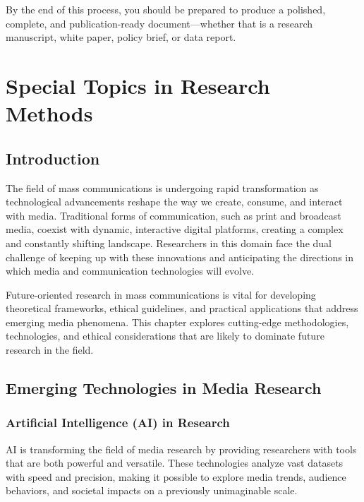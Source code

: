 \documentclass[
]{book}
\begin{document}
By the end of this process, you should be prepared to produce a polished, complete, and publication-ready document---whether that is a research manuscript, white paper, policy brief, or data report.

\chapter{Special Topics in Research Methods}\label{special-topics-in-research-methods}

\section{Introduction}\label{introduction-1}

The field of mass communications is undergoing rapid transformation as technological advancements reshape the way we create, consume, and interact with media. Traditional forms of communication, such as print and broadcast media, coexist with dynamic, interactive digital platforms, creating a complex and constantly shifting landscape. Researchers in this domain face the dual challenge of keeping up with these innovations and anticipating the directions in which media and communication technologies will evolve.

Future-oriented research in mass communications is vital for developing theoretical frameworks, ethical guidelines, and practical applications that address emerging media phenomena. This chapter explores cutting-edge methodologies, technologies, and ethical considerations that are likely to dominate future research in the field.

\section{Emerging Technologies in Media Research}\label{emerging-technologies-in-media-research}

\subsection*{Artificial Intelligence (AI) in Research}\label{artificial-intelligence-ai-in-research}

AI is transforming the field of media research by providing researchers with tools that are both powerful and versatile. These technologies analyze vast datasets with speed and precision, making it possible to explore media trends, audience behaviors, and societal impacts on a previously unimaginable scale.
\end{document}
